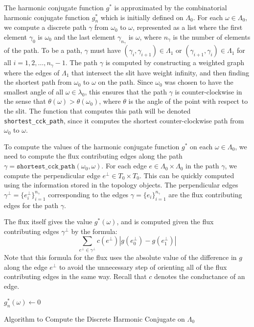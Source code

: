 \documentclass{article}
\begin{document}
The harmonic conjugate function $g^*$ is approximated by the combinatorial harmonic conjugate function $g^*_n$ which is initially defined on $\Lambda_0$. For each $\omega \in \Lambda_0$, we compute a discrete path $\gamma$ from $\omega_0$ to $\omega$, represented as a list where the first element $\gamma_0$ is $\omega_0$ and the last element $\gamma_{n_\gamma}$ is $\omega$, where $n_\gamma$ is the number of elements of the path. To be a path, $\gamma$ must have $(\gamma_i, \gamma_{i + 1}) \in \Lambda_1$ or $(\gamma_{i + 1}, \gamma_i) \in \Lambda_1$ for all $i = 1, 2, \dots, n_\gamma - 1$. The path $\gamma$ is computed by constructing a weighted graph where the edges of $\Lambda_1$ that intersect the slit have weight infinity, and then finding the shortest path from $\omega_0$ to $\omega$ on the path. Since $\omega_0$ was chosen to have the smallest angle of all $\omega \in \lambda_0$, this ensures that the path $\gamma$ is counter-clockwise in the sense that $\theta(\omega) > \theta(\omega_0)$, where $\theta$ is the angle of the point with respect to the slit. The function that computes this path will be denoted \texttt{shortest\_cck\_path}, since it computes the shortest counter-clockwise path from $\omega_0$ to $\omega$.

To compute the values of the harmonic conjugate function $g^*$ on each $\omega \in \Lambda_0$, we need to compute the flux contributing edges along the path $\gamma = \texttt{shortest\_cck\_path} (\omega_0, \omega)$. For each edge $e \in \Lambda_0 \times \Lambda_0$ in the path $\gamma$, we compute the perpendicular edge $e^\perp \in T_0 \times T_0$. This can be quickly computed using the information stored in the topology objects. The perpendicular edges $\gamma^\perp = \{ e^\perp_i \}_{i = 1}^{n_\gamma}$ corresponding to the edges $\gamma = \{ e_i \}_{i = 1}^{n_\gamma}$ are the flux contributing edges for the path $\gamma$.

The flux itself gives the value $g^* (\omega)$, and is computed given the flux contributing edges $\gamma^\perp$ by the formula:
\[
	\sum_{e^\perp \in \gamma^\perp} c(e^\perp) | g(e^\perp_0) - g(e^\perp_1) |
\]
Note that this formula for the flux uses the absolute value of the difference in $g$ along the edge $e^\perp$ to avoid the unnecessary step of orienting all of the flux contributing edges in the same way. Recall that $c$ denotes the conductance of an edge.

\begin{algorithm}%
	\SetAlgoLined
	\LinesNumbered
	\DontPrintSemicolon
	$g^*_n (\omega) \leftarrow 0$\;
	\caption{Algorithm to Compute the Discrete Harmonic Conjugate on $\Lambda_0$}
\end{algorithm}
\end{document}
